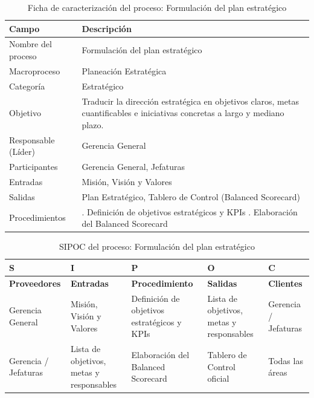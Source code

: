 \documentclass[11pt, a4paper, oneside]{report}
\begin{document}
\begin{table}[H]
\centering\small
\renewcommand{\arraystretch}{1.35}
\setlength{\tabcolsep}{6pt}
\begin{tabularx}{\textwidth}{|>{\raggedright\arraybackslash}p{}|>{\raggedright\arraybackslash}X|}
\hline
\rowcolor{upeu_dark}
\color{white}\bfseries Campo & \color{white}\bfseries Descripción \\ \hline
\rowcolor{gray!10}
Nombre del proceso & Formulación del plan estratégico \\ \hline
Macroproceso & Planeación Estratégica \\ \hline
\rowcolor{gray!10}
Categoría & Estratégico \\ \hline
Objetivo & Traducir la dirección estratégica en objetivos claros, metas cuantificables e iniciativas concretas a largo y mediano plazo. \\ \hline
\rowcolor{gray!10}
Responsable (Líder) & Gerencia General \\ \hline
Participantes & Gerencia General, Jefaturas \\ \hline
\rowcolor{gray!10}
Entradas & Misión, Visión y Valores \\ \hline
Salidas & Plan Estratégico, Tablero de Control (Balanced Scorecard) \\ \hline
\rowcolor{gray!10}
Procedimientos & 1. Definición de objetivos estratégicos y KPIs \newline 2. Elaboración del Balanced Scorecard \\ \hline
\end{tabularx}
\caption{Ficha de caracterización del proceso: Formulación del plan estratégico}
\end{table}

\begin{table}[H]
\centering\small
\renewcommand{\arraystretch}{1.3}
\setlength{\tabcolsep}{4pt}
\begin{tabularx}{\textwidth}{|>{\raggedright\arraybackslash}p{}|>{\raggedright\arraybackslash}p{}|>{\raggedright\arraybackslash}p{}|>{\raggedright\arraybackslash}p{}|>{\raggedright\arraybackslash}X|}
\hline
\rowcolor{upeu_dark}
\color{white}\bfseries S & \color{white}\bfseries I & \color{white}\bfseries P & \color{white}\bfseries O & \color{white}\bfseries C \\ \hline
\rowcolor{upeu_light}
\bfseries Proveedores & \bfseries Entradas & \bfseries Procedimiento & \bfseries Salidas & \bfseries Clientes \\ \hline
Gerencia General &
Misión, Visión y Valores &
Definición de objetivos estratégicos y KPIs &
Lista de objetivos, metas y responsables &
Gerencia / Jefaturas \\ \hline
\rowcolor{gray!10}
Gerencia / Jefaturas &
Lista de objetivos, metas y responsables &
Elaboración del Balanced Scorecard &
Tablero de Control oficial &
Todas las áreas \\ \hline
\end{tabularx}
\caption{SIPOC del proceso: Formulación del plan estratégico}
\end{table}
\end{document}
